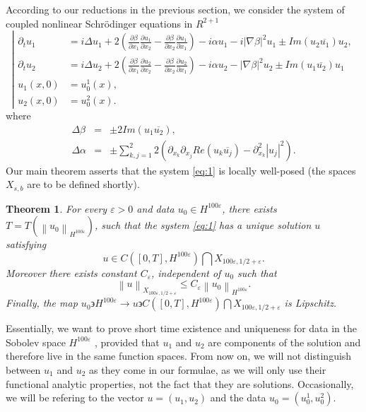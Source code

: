 \documentclass[draft,11pt,leqno]{amsart}
\newtheorem{theorem}{Theorem}
\newcommand{\norm}[2]{{\left\| #1 \right\|}_{#2}}
\newcommand{\al}{\alpha}
\newcommand{\De}{\Delta}
\newcommand{\ve}{\varepsilon}
\newcommand{\suml}{\sum\limits}
\newcommand{\f}{\displaystyle\frac}
\newcommand{\p}{\partial}
\newcommand{\pp}[2]{\f{\p #1}{\p #2}}
\begin{document}
According to our reductions in the previous section, 
we consider the system of coupled nonlinear Schr\"odinger  equations
in $R^{2+1}$
\begin{equation}
\label{eq:1}
\displaystyle\left|\begin{array}{rl}
\p_t u_1 &= i\De u_1+2 
\left(\pp{\beta}{x_1}\pp{u_1}{x_2}-
\pp{\beta}{x_2}\pp{u_1}{x_1}\right)-i\al u_1-i|\nabla \beta|^2u_1\pm
Im(u_2 \overline{u_1})u_2, \\
\p_t u_2 &= i\De u_2+2\left(\pp{\beta}{x_1}\pp{u_2}{x_2}-
\pp{\beta}{x_2}\pp{u_2}{x_1}\right)-i \al u_2-|\nabla \beta|^2u_2
\pm  Im(u_1\overline{u_2})u_1\\
u_1(x,0) & = u^1_0(x),\\
u_2(x,0) &= u^2_0(x).
\end{array}
\right.
\end{equation}
where
\begin{eqnarray*}
\De \beta &=& \pm 2 Im (u_1\overline{u_2}), \\
\De \al &=& \pm \suml_{k,j=1}^2
2\left(\p_{x_k}\p_{x_j} Re(u_k\overline{u_j})-
\p_{x_k}^2|u_j|^2\right).
\end{eqnarray*}
Our main theorem asserts that the system \eqref{eq:1} is locally 
well-posed (the spaces $X_{s,b}$ are to be defined shortly).
\begin{theorem}
\label{theo:main}
For every $\ve>0$ and data $u_0\in H^{100\ve}$, 
there exists $T=T(\norm{u_0}{H^{100\ve}})$, such that the system \eqref{eq:1}
has a unique solution $u$ satisfying
$$
u\in C([0,T],H^{100\ve})\bigcap X_{100\ve, 1/2+\ve}.
$$
Moreover there exists constant $C_\ve$, independent of $u_0$ such that
\begin{equation}
\label{eq:700}
\norm{u}{X_{100\ve, 1/2+\ve}}\leq C_\ve\norm{u_0}{H^{100\ve}}.
\end{equation}
Finally, the map $u_0\backepsilon H^{100\ve}\to u\backepsilon
 C([0,T],H^{100\ve})\bigcap X_{100\ve, 1/2+\ve}$ is 
Lipschitz.
\end{theorem}
Essentially, we want to prove short time existence and
uniqueness for data in the Sobolev space $H^{100\ve}$ , 
provided that $u_1$ and $u_2$ are components of the solution and 
therefore live
in the same function spaces. From now on, we will not distinguish between
$u_1$ and $u_2$ as they come in our formulae, as we will only use their 
functional analytic properties, not the fact that they are solutions.
Occasionally, we will be  refering to the  vector $u=(u_1,u_2)$ and 
the data 
$u_0=(u^1_0, u^2_0)$. 
\end{document}
